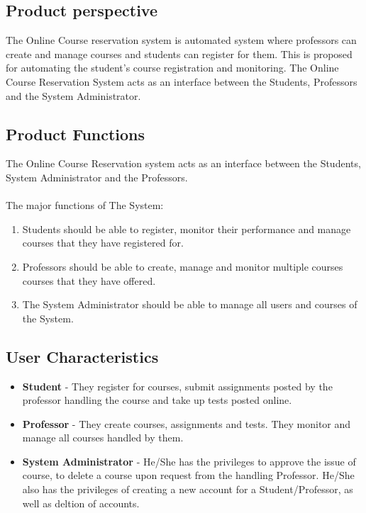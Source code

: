 \documentclass[12pt, a4]{article}
\begin{document}
\subsection{Product perspective}
The Online Course reservation system is automated system where professors can create and manage courses and students can register for them. This is proposed for automating the student’s course registration and monitoring. The Online Course Reservation System acts as an interface between the Students, Professors and the System Administrator.


\subsection{Product Functions}
The Online Course Reservation system acts as an interface between the Students, System Administrator and the Professors.
\\\\
The major functions of The System:
\begin{enumerate}
    \item Students should be able to register, monitor their performance and manage courses that they have registered for.
    \item Professors should be able to create, manage and monitor multiple courses courses that they have offered.
    \item The System Administrator should be able to manage all users and courses of the System.
\end{enumerate}


\subsection{User Characteristics}
\begin{itemize}
    \item \textbf{Student} - They register for courses, submit assignments posted by the professor handling the course and take up tests posted online.
    \item \textbf{Professor} - They create courses, assignments and tests. They monitor and manage all courses handled by them.
    \item \textbf{System Administrator} - He/She has the privileges to approve the issue of course, to delete a course upon request from the handling Professor. He/She also has the privileges of creating a new account for a Student/Professor, as well as deltion of accounts.
\end{itemize}
\end{document}
